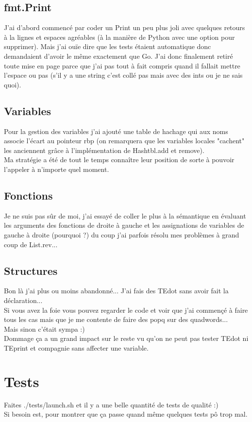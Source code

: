 \documentclass{article}
\begin{document}
\subsection{fmt.Print}
J'ai d'abord commencé par coder un Print un peu plus joli avec quelques retours à la lignes et espaces agréables (à la manière de Python avec une option pour supprimer). Mais j'ai ouïe dire que les tests étaient automatique donc demandaient d'avoir le même exactement que Go. J'ai donc finalement retiré toute mise en page parce que j'ai pas tout à fait compris quand il fallait mettre l'espace ou pas (s'il y a une string c'est collé pas mais avec des ints ou je ne sais quoi).

\subsection{Variables}
Pour la gestion des variables j'ai ajouté une table de hachage qui aux noms associe l'écart au pointeur rbp (on remarquera que les variables locales "cachent" les anciennent grâce à l'implémentation de Hashtbl.add et remove).\\
Ma stratégie a été de tout le temps connaître leur position de sorte à pouvoir l'appeler à n'importe quel moment.

\subsection{Fonctions}
Je ne suis pas sûr de moi, j'ai essayé de coller le plus à la sémantique en évaluant les arguments des fonctions de droite à gauche et les assignations de variables de gauche à droite (pourquoi ?) du coup j'ai parfois résolu mes problèmes à grand coup de List.rev...

\subsection{Structures}
Bon là j'ai plus ou moins abandonné... J'ai fais des TEdot sans avoir fait la déclaration...\\
Si vous avez la foie vous pouvez regarder le code et voir que j'ai commençé à faire tous les cas mais que je me contente de faire des popq sur des quadwords...\\
Mais sinon c'était sympa :)\\
Dommage ça a un grand impact sur le reste vu qu'on ne peut pas tester TEdot ni TEprint et compagnie sans affecter une variable.

\section{Tests}
Faites ./tests/launch.sh et il y a une belle quantité de tests de qualité :)\\
Si besoin est, pour montrer que ça passe quand même quelques tests pô trop mal.
\end{document}
